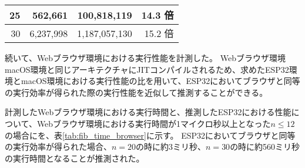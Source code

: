 \begin{table}[htbp]
\begin{center}
\begin{tabular}{rrrr}
      25 &   562,661 &   100,818,119 & 14.3 倍 \\ \hline
      30 & 6,237,998 & 1,187,057,130 & 15.2 倍 \\ \hline
    \end{tabular}
  \end{center}
\end{table}

\newpage

続いて、Webブラウザ環境における実行性能を計測した。
Webブラウザ環境macOS環境と同じアーキテクチャにJITコンパイルされるため、求めたESP32環境とmacOS環境における実行性能の比を用いて、ESP32においてブラウザと同等の実行効率が得られた際の実行性能を近似して推測することができる。

計測したWebブラウザ環境における実行時間と、推測したESP32における性能について、Webブラウザ環境における実行時間が1マイクロ秒以上となった$n\leq12$の場合にを、表\ref{tab:fib_time_browser}に示す。
ESP32においてブラウザと同等の実行効率が得られた場合、$n=20$の時に約3ミリ秒、$n=30$の時に約560ミリ秒の実行時間となることが推測された。

